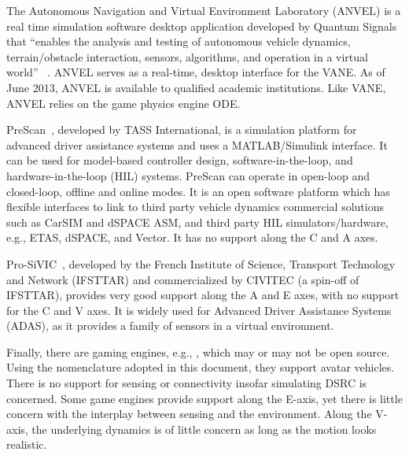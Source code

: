 The Autonomous Navigation and Virtual Environment Laboratory (ANVEL) is a real time simulation software desktop application developed by Quantum Signals that ``enables the analysis and testing of autonomous vehicle dynamics, terrain/obstacle interaction, sensors, algorithms, and operation in a virtual world'' ~\cite{ANVEL-website}. ANVEL serves as a real-time, desktop interface for the VANE. As of June 2013, ANVEL is available to qualified academic institutions. Like VANE, ANVEL relies on the game physics engine ODE.

PreScan~\cite{PreScan-website}, developed by TASS International, is a simulation platform for advanced driver assistance systems and uses a MATLAB/Simulink interface. It can be used for model-based controller design, software-in-the-loop, and hardware-in-the-loop (HIL) systems. PreScan can operate in open-loop and closed-loop, offline and online modes. It is an open software platform which has flexible interfaces to link to third party vehicle dynamics commercial solutions such as CarSIM and dSPACE ASM, and third party HIL simulators/hardware, e.g., ETAS, dSPACE, and Vector. It has no support along the C and A axes.

Pro-SiVIC~\cite{Hiblot-2010, Belbachir-2015}, developed by the French Institute of Science, Transport Technology and Network (IFSTTAR) and commercialized by CIVITEC (a spin-off of IFSTTAR), provides very good support along the A and E axes, with no support for the C and V axes. It is widely used for Advanced Driver Assistance Systems (ADAS), as it provides a family of sensors in a virtual environment. 

Finally, there are gaming engines, e.g., \cite{unityGaming,unrealEngine}, which may or may not be open source. Using the nomenclature adopted in this document, they support avatar vehicles. There is no support for sensing or connectivity insofar simulating DSRC is concerned. Some game engines provide support along the E-axis, yet there is little concern with the interplay between sensing and the environment. Along the V-axis, the underlying dynamics is of little concern as long as the motion looks realistic.


